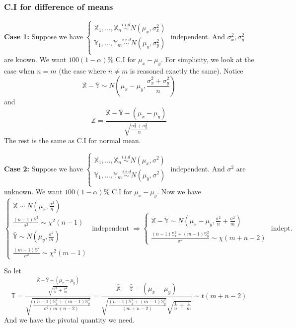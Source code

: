 \subsubsection{C.I for difference of means}

\textbf{Case 1: } Suppose we have
$\begin{cases}
\mathbb{X}_1, ..., \mathbb{X}_n \overset{i.i.d}{\sim} N(\mu_x, \sigma_x^2) \\
\mathbb{Y}_1, ..., \mathbb{Y}_m \overset{i.i.d}{\sim} N(\mu_y, \sigma_y^2) \\
\end{cases}$
independent. And $\sigma_x^2, \sigma_y^2$ are known. We want $100(1-\alpha)\%$ C.I for $\mu_x - \mu_y$. For simplicity, we look at the case when $n=m$ (the case where $n\neq m$ is reasoned exactly the same). Notice
$$\bar{\mathbb{X}} - \bar{\mathbb{Y}} \sim N(\mu_x - \mu_y, \frac{\sigma_x^2+\sigma_y^2}{n})$$
and $$\mathbb{Z} = \frac{\bar{\mathbb{X}} - \bar{\mathbb{Y}} - (\mu_x - \mu_y)}{\sqrt{\frac{\sigma_x^2+\sigma_y^2}{n}}}$$
The rest is the same as C.I for normal mean.

\textbf{Case 2: } Suppose we have
$\begin{cases}
\mathbb{X}_1, ..., \mathbb{X}_n \overset{i.i.d}{\sim} N(\mu_x, \sigma^2) \\
\mathbb{Y}_1, ..., \mathbb{Y}_m \overset{i.i.d}{\sim} N(\mu_y, \sigma^2) \\
\end{cases}$
independent. And $\sigma^2$ are unknown. We want $100(1-\alpha)\%$ C.I for $\mu_x - \mu_y$. Now we have
$$\begin{cases}
\bar{\mathbb{X}} \sim N(\mu_x, \frac{\sigma^2}{n}) \\
\frac{(n-1)\mathbb{S}^2}{\sigma^2} \sim \chi^2(n-1) \\
\bar{\mathbb{Y}} \sim N(\mu_y, \frac{\sigma^2}{m}) \\
\frac{(m-1)\mathbb{S}^2}{\sigma^2} \sim \chi^2(m-1)
\end{cases}
\text{ independent } \Rightarrow 
\begin{cases}
\bar{\mathbb{X}} - \bar{\mathbb{Y}} \sim N(\mu_x-\mu_y, \frac{\sigma^2}{n} + \frac{\sigma^2}{m}) \\
\frac{(n-1)\mathbb{S}_x^2 + (m-1)\mathbb{S}_y^2}{\sigma^2} \sim \chi(m+n-2)
\end{cases}
\text{ indept. }
$$

So let
$$\mathbb{T} = \frac{\frac{\bar{\mathbb{X}} - \bar{\mathbb{Y}} - (\mu_x-\mu_y)}{\sqrt{\frac{\sigma^2}{n} + \frac{\sigma^2}{m}}}}{\sqrt{\frac{(n-1)\mathbb{S}_x^2 + (m-1)\mathbb{S}_y^2}{\sigma^2 (m+n-2)}}} = \frac{\bar{\mathbb{X}} - \bar{\mathbb{Y}} - (\mu_x-\mu_y)}{\sqrt{\frac{(n-1)\mathbb{S}_x^2 + (m-1)\mathbb{S}_y^2}{(m+n-2)}} \sqrt{\frac{1}{n} + \frac{1}{m}}} \sim t(m+n-2)$$
And we have the pivotal quantity we need.

